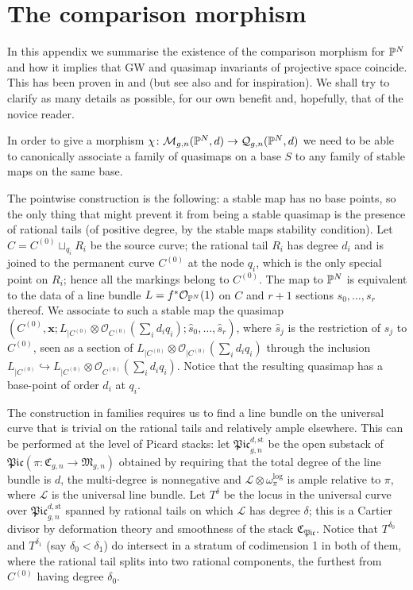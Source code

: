 \section{The comparison morphism} \label{Section comparison morphism}

In this appendix we summarise the existence of the comparison morphism for $\mathbb P^N$ and how it implies that GW and quasimap invariants of projective space coincide. This has been proven in \cite[Theorem 3]{MOP} and \cite[Section 4.3]{Manolache-Push} (but see also \cite[Proposition 4.1]{Bertram} and \cite[Theorem 7.1]{Popa-Roth} for inspiration). We shall try to clarify as many details as possible, for our own benefit and, hopefully, that of the novice reader.

In order to give a morphism $\chi\colon\mathcal{M}_{g,n}(\mathbb P^N,d)\rightarrow\mathcal{Q}_{g,n}(\mathbb P^N,d)$ we need to be able to canonically associate a family of quasimaps on a base $S$ to any family of stable maps on the same base.

The pointwise construction is the following: a stable map has no base points, so the only thing that might prevent it from being a stable quasimap is the presence of rational tails (of positive degree, by the stable maps stability condition). Let $C=C^{(0)}\sqcup_{q_i}R_i$ be the source curve; the rational tail $R_i$ has degree $d_i$ and is joined to the permanent curve $C^{(0)}$ at the node $q_i$, which is the only special point on $R_i$; hence all the markings belong to $C^{(0)}$. The map to $\mathbb P^N$ is equivalent to the data of a line bundle $L=f^*\mathcal O_{\mathbb P^N}(1)$ on $C$ and $r+1$ sections $s_0,\ldots,s_r$ thereof. We associate to such a stable map the quasimap $(C^{(0)},\mathbf x; L_{|C^{(0)}}\otimes\mathcal O_{C^{(0)}}(\sum_{i}d_iq_i);\hat s_0,\ldots,\hat s_r)$, where $\hat s_j$ is the restriction of $s_j$ to $C^{(0)}$, seen as a section of $L_{|C^{(0)}}\otimes\mathcal O_{|C^{(0)}}(\sum_{i}d_iq_i)$ through the inclusion $L_{|C^{(0)}}\hookrightarrow L_{|C^{(0)}}\otimes\mathcal O_{C^{(0)}}(\sum_{i}d_iq_i)$. Notice that the resulting quasimap has a base-point of order $d_i$ at $q_i$.

The construction in families requires us to find a line bundle on the universal curve that is trivial on the rational tails and relatively ample elsewhere. This can be performed at the level of Picard stacks: let $\mathfrak{Pic}_{g,n}^{d,\text{st}}$ be the open substack of $\mathfrak{Pic}(\pi\colon\mathfrak{C}_{g,n}\to\mathfrak{M}_{g,n})$ obtained by requiring that the total degree of the line bundle is $d$, the multi-degree is nonnegative and $\mathcal L\otimes\omega_{\pi}^{\text{log}}$ is ample relative to $\pi$, where $\mathcal L$ is the universal line bundle. Let $T^{\delta}$ be the locus in the universal curve over $\mathfrak{Pic}_{g,n}^{d,\text{st}}$ spanned by rational tails on which $\mathcal L$ has degree $\delta$; this is a Cartier divisor by deformation theory and smoothness of the stack $\mathfrak{C}_{\mathfrak{Pic}}$. Notice that $T^{\delta_0}$ and $T^{\delta_1}$ (say $\delta_0<\delta_1$) do intersect in a stratum of codimension 1 in both of them, where the rational tail splits into two rational components, the furthest from $C^{(0)}$ having degree $\delta_0$.

